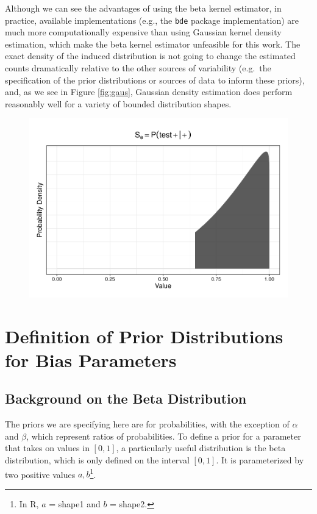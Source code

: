 \documentclass[12pt,twoside]{smiththesis}
\begin{document}
Although we can see the advantages of using the beta kernel estimator, in practice, available implementations (e.g., the \texttt{bde} package implementation) are much more computationally expensive than using Gaussian kernel density estimation, which make the beta kernel estimator unfeasible for this work. The exact density of the induced distribution is not going to change the estimated counts dramatically relative to the other sources of variability (e.g.~the specification of the prior distributions or sources of data to inform these priors), and, as we see in Figure \ref{fig:gaus}, Gaussian density estimation does perform reasonably well for a variety of bounded distribution shapes.
\begin{figure}

{\centering \includegraphics[width=1\linewidth]{thesis_files/figure-latex/unnamed-chunk-46-1} 

}

\caption{\label{fig:gaus}}\label{fig:unnamed-chunk-46}
\end{figure}
\hypertarget{defpriors}{%
\chapter{Definition of Prior Distributions for Bias Parameters}\label{defpriors}}

\hypertarget{background-on-the-beta-distribution}{%
\section{Background on the Beta Distribution}\label{background-on-the-beta-distribution}}

The priors we are specifying here are for probabilities, with the exception of \(\alpha\) and \(\beta\), which represent ratios of probabilities. To define a prior for a parameter that takes on values in \([0,1]\), a particularly useful distribution is the beta distribution, which is only defined on the interval \([0,1]\). It is parameterized by two positive values \(a, b\)\footnote{In R, \(a\) = shape1 and \(b\) = shape2.}.
\end{document}
